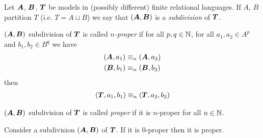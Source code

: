 \documentclass{amsart}
\DeclareMathOperator{\TT}{\boldface T}
\DeclareMathOperator{\A}{\boldface A}
\DeclareMathOperator{\B}{\boldface B}
\begin{document}
\begin{Definition}
	Let $\A$, $\B$, $\TT$ be models in (possibly different) finite relational languages. If $A$, $B$ partition $T$ (i.e. $T = A \sqcup B$) we say that $(\A, \B)$ is a \emph{subdivision} of $\TT$.
\end{Definition}

\begin{Definition}
	$(\A, \B)$ subdivision of $\TT$ is called \emph{$n$-proper} if for all $p,q \in \mathbb{N}$, for all $a_1, a_2 \in A^p$ and $b_1, b_2 \in B^q$ we have
	\begin{align*}
		(\A, a_1) &\equiv_n (\A, a_2) \\
		(\B, b_1) &\equiv_n (\B, b_2)
	\end{align*}
	then
	\begin{align*}
		(\TT, a_1, b_1) \equiv_n (\TT, a_2, b_2)
	\end{align*}
\end{Definition}

\begin{Definition}
	$(\A, \B)$ subdivision of $\TT$ is called \emph{proper} if it is $n$-proper for all $n \in \mathbb{N}$.
\end{Definition}

\begin{Lemma} \label{lm_subdivision}
	Consider a subdivision $(\A, \B)$ of $\TT$. If it is $0$-proper then it is proper.
\end{Lemma}
\end{document}
